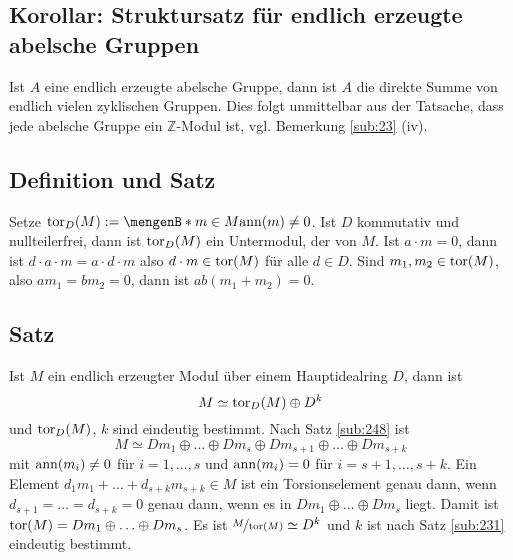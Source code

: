 \subsection{Korollar: Struktursatz für endlich erzeugte abelsche Gruppen} %
\label{sub:249}
Ist $A$ eine endlich erzeugte abelsche Gruppe, dann ist $A$ die direkte Summe von endlich vielen zyklischen Gruppen.
Dies folgt unmittelbar aus der Tatsache, dass jede abelsche Gruppe ein $\mathds{Z}$-Modul ist, vgl. Bemerkung \ref{sub:23} (iv). \bewende

\subsection[Definition und Satz: Torsionsmodul]{Definition und Satz} %
\label{sub:250}
Setze $\tor_D(M) := \set[m \in M]{\ann(m)\not= 0}$. Ist $D$ kommutativ und nullteilerfrei, dann ist $\operatorname{tor}_D(M)$ ein Untermodul, der  von $M$.
Ist $a \cdot m = 0$, dann ist $d \cdot a \cdot m= a \cdot d \cdot m$ also $d \cdot m \in \operatorname{tor}(M)$ für alle $d \in D$. Sind $m_1, m_2 \in \operatorname{tor}(M)$, also
$a m_1 = b m_2 = 0$, dann ist $a b( m_1 + m_2)=0$. \bewende

\subsection[Satz: Zerlegung eines endlich erzeugten Moduls in Torsionsmodul und freien Modul]{Satz} %
\label{sub:251}
Ist $M$ ein endlich erzeugter Modul über einem Hauptidealring $D$, dann ist 
\[
	M \simeq \operatorname{tor}_D(M) \oplus D^k
\]
und $\operatorname{tor}_D(M)$, $k$ sind eindeutig bestimmt.
Nach Satz \ref{sub:248} ist 
\[
	M \simeq D m_1 \oplus \ldots \oplus D m_s \oplus D m_{s+1} \oplus \ldots \oplus D m_{s+k}
\]
mit $\operatorname{ann}(m_i) \not= 0$ für $i=1, \ldots ,s$ und $\operatorname{ann}(m_i)= 0$ für $i=s+1, \ldots , s+k$. Ein Element $d_1 m_1 + \ldots  + d_{s+k} m_{s+k} \in M$ ist ein Torsionselement
genau dann, wenn $d_{s+1} = \ldots = d_{s+k}=0$ genau dann, wenn es in $Dm_1\oplus \ldots \oplus D m_s$ liegt. Damit ist $\operatorname{tor}(M)= D m_1 \oplus \ldots \oplus D m_s$.
Es ist $\nicefrac{M}{\operatorname{tor}(M)} \simeq D^k$ und $k$ ist nach Satz \ref{sub:231} eindeutig bestimmt.

